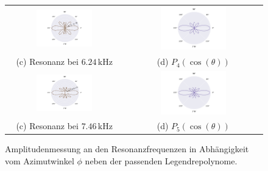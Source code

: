 \begin{figure}[H]
\begin{tabular}{cc}
  \includegraphics[width=0.5\textwidth]{Daten/Wasserstoff/neu/peak2.pdf} &   \includegraphics[width=0.5\textwidth]{Daten/Wasserstoff/peakLeg2.pdf} \\
  (c) Resonanz bei $6.24 \,\si{\kilo\hertz}$ & (d) $P_4(\cos(\theta))$ \\[6pt]
  \includegraphics[width=0.5\textwidth]{Daten/Wasserstoff/neu/peak3.pdf} &   \includegraphics[width=0.5\textwidth]{Daten/Wasserstoff/peakLeg3.pdf} \\
  (c) Resonanz bei $7.46 \,\si{\kilo\hertz}$ & (d) $P_5(\cos(\theta))$ \\[6pt]
  
  \end{tabular}
  \caption{Amplitudenmessung an den Resonanzfrequenzen in Abhängigkeit vom Azimutwinkel $\phi$ neben der passenden Legendrepolynome. } 
  \label{fig:hpeaks}
\end{figure}


